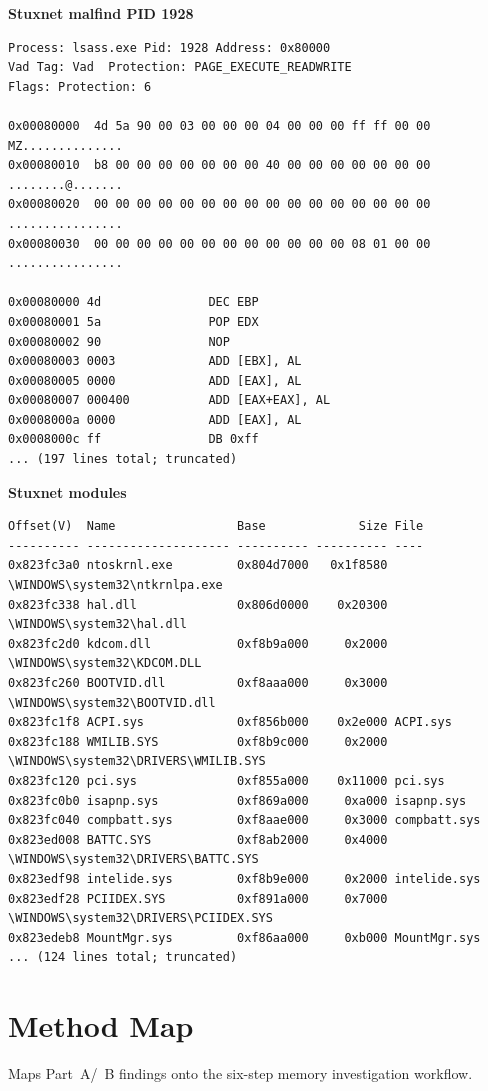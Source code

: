 \documentclass[11pt,letterpaper]{article}
\begin{document}
\noindent\textbf{Stuxnet malfind PID 1928}
\begin{lstlisting}
Process: lsass.exe Pid: 1928 Address: 0x80000
Vad Tag: Vad  Protection: PAGE_EXECUTE_READWRITE
Flags: Protection: 6

0x00080000  4d 5a 90 00 03 00 00 00 04 00 00 00 ff ff 00 00   MZ..............
0x00080010  b8 00 00 00 00 00 00 00 40 00 00 00 00 00 00 00   ........@.......
0x00080020  00 00 00 00 00 00 00 00 00 00 00 00 00 00 00 00   ................
0x00080030  00 00 00 00 00 00 00 00 00 00 00 00 08 01 00 00   ................

0x00080000 4d               DEC EBP
0x00080001 5a               POP EDX
0x00080002 90               NOP
0x00080003 0003             ADD [EBX], AL
0x00080005 0000             ADD [EAX], AL
0x00080007 000400           ADD [EAX+EAX], AL
0x0008000a 0000             ADD [EAX], AL
0x0008000c ff               DB 0xff
... (197 lines total; truncated)
\end{lstlisting}

\noindent\textbf{Stuxnet modules}
\begin{lstlisting}
Offset(V)  Name                 Base             Size File
---------- -------------------- ---------- ---------- ----
0x823fc3a0 ntoskrnl.exe         0x804d7000   0x1f8580 \WINDOWS\system32\ntkrnlpa.exe
0x823fc338 hal.dll              0x806d0000    0x20300 \WINDOWS\system32\hal.dll
0x823fc2d0 kdcom.dll            0xf8b9a000     0x2000 \WINDOWS\system32\KDCOM.DLL
0x823fc260 BOOTVID.dll          0xf8aaa000     0x3000 \WINDOWS\system32\BOOTVID.dll
0x823fc1f8 ACPI.sys             0xf856b000    0x2e000 ACPI.sys
0x823fc188 WMILIB.SYS           0xf8b9c000     0x2000 \WINDOWS\system32\DRIVERS\WMILIB.SYS
0x823fc120 pci.sys              0xf855a000    0x11000 pci.sys
0x823fc0b0 isapnp.sys           0xf869a000     0xa000 isapnp.sys
0x823fc040 compbatt.sys         0xf8aae000     0x3000 compbatt.sys
0x823ed008 BATTC.SYS            0xf8ab2000     0x4000 \WINDOWS\system32\DRIVERS\BATTC.SYS
0x823edf98 intelide.sys         0xf8b9e000     0x2000 intelide.sys
0x823edf28 PCIIDEX.SYS          0xf891a000     0x7000 \WINDOWS\system32\DRIVERS\PCIIDEX.SYS
0x823edeb8 MountMgr.sys         0xf86aa000     0xb000 MountMgr.sys
... (124 lines total; truncated)
\end{lstlisting}

\section*{Method Map}
Maps Part~A/~B findings onto the six-step memory investigation workflow.
\end{document}
